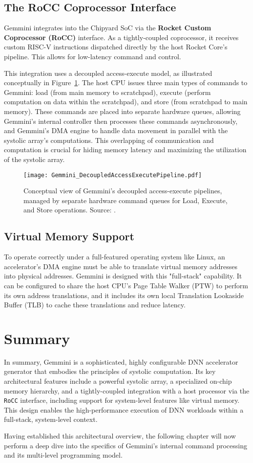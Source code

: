 \subsection{The RoCC Coprocessor Interface}
Gemmini integrates into the Chipyard SoC via the \textbf{Rocket Custom Coprocessor (RoCC)} interface. As a tightly-coupled coprocessor, it receives custom RISC-V instructions dispatched directly by the host Rocket Core's pipeline. This allows for low-latency command and control.



This integration uses a decoupled access-execute model, as illustrated conceptually in Figure~\ref{fig:decoupled_pipelines}. The host CPU issues three main types of commands to Gemmini: load (from main memory to scratchpad), execute (perform computation on data within the scratchpad), and store (from scratchpad to main memory). These commands are placed into separate hardware queues, allowing Gemmini's internal controller then processes these commands asynchronously, and Gemmini's DMA engine to handle data movement in parallel with the systolic array's computations. This overlapping of communication and computation is crucial for hiding memory latency and maximizing the utilization of the systolic array.

\begin{figure}[htbp]
    \centering
    \texttt{[image: Gemmini\_DecoupledAccessExecutePipeline.pdf]}
    \caption{Conceptual view of Gemmini's decoupled access-execute pipelines, managed by separate hardware command queues for Load, Execute, and Store operations. Source: \cite{gemini-dac}.}
    \label{fig:decoupled_pipelines}
\end{figure}

\subsection{Virtual Memory Support}
To operate correctly under a full-featured operating system like Linux, an accelerator's DMA engine must be able to translate virtual memory addresses into physical addresses. Gemmini is designed with this "full-stack" capability. It can be configured to share the host CPU's Page Table Walker (PTW) to perform its own address translations, and it includes its own local Translation Lookaside Buffer (TLB) to cache these translations and reduce latency.

\section{Summary}
\label{sec:gemmini_overview_summary}
In summary, Gemmini is a sophisticated, highly configurable DNN accelerator generator that embodies the principles of systolic computation. Its key architectural features include a powerful systolic array, a specialized on-chip memory hierarchy, and a tightly-coupled integration with a host processor via the \texttt{RoCC} interface, including support for system-level features like virtual memory. This design enables the high-performance execution of DNN workloads within a full-stack, system-level context. 

Having established this architectural overview, the following chapter will now perform a deep dive into the specifics of Gemmini's internal command processing and its multi-level programming model.